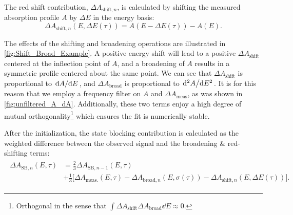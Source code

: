 The red shift contribution, $\Delta A_{\textrm{shift},n}$, is calculated by shifting the measured absorption profile $A$ by $\Delta E$ in the energy basis:
\begin{equation}
\Delta A_{\textrm{shift},n}(E, \Delta E(\tau)) = A(E- \Delta E(\tau)) - A(E).
\label{eqn:dA_Shift}
\end{equation}

The effects of the shifting and broadening operations are illustrated in \cref{fig:Shift_Broad_Example}. A positive energy shift will lead to a positive $\Delta A_{\textrm{shift}}$ centered at the inflection point of $A$, and a broadening of $A$ results in a symmetric profile centered about the same point. We can see that $\Delta A_{\textrm{shift}}$ is proportional to $\dv*{A}{E}$, and $\Delta A_{\textrm{broad}}$ is proportional to $\dv*[2]{A}{E}$. It is for this reason that we employ a frequency filter on $A$ and $\Delta A_{\textrm{meas}}$, as was shown in \cref{fig:unfiltered_A_dA}. Additionally, these two terms enjoy a high degree of mutual orthogonality\footnote{Orthogonal in the sense that $\int \Delta A_{\textrm{shift}} \Delta A_{\textrm{broad}} \dd{E} \approx 0$.} which ensures the fit is numerically stable.

After the initialization, the state blocking contribution is calculated as the weighted difference between the observed signal and the broadening \& red-shifting terms:
\begin{align}
\begin{split}
\Delta A_{\textrm{SB},n}(E,\tau) &= \frac{2}{3} \Delta A_{\textrm{SB},n-1}(E,\tau) \\
&+ \frac{1}{3} \Big[ \Delta A_{\textrm{meas.}}(E,\tau) - \Delta A_{\textrm{broad},n}(E, \sigma(\tau))- \Delta A_{\textrm{shift},n}(E,\Delta E(\tau)) \Big].
\end{split}
\end{align}


